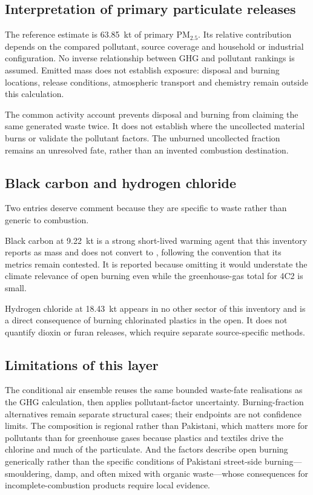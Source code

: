 \subsection{Interpretation of primary particulate releases}

The reference estimate is \SI{63.85}{\kilo\tonne} of primary PM$_{2.5}$. Its relative contribution depends on the compared pollutant, source coverage and household or industrial configuration. No inverse relationship between GHG and pollutant rankings is assumed. Emitted mass does not establish exposure: disposal and burning locations, release conditions, atmospheric transport and chemistry remain outside this calculation.

The common activity account prevents disposal and burning from claiming the same generated waste twice. It does not establish where the uncollected material burns or validate the pollutant factors. The unburned uncollected fraction remains an unresolved fate, rather than an invented combustion destination.

\subsection{Black carbon and hydrogen chloride}

Two entries deserve comment because they are specific to waste rather than generic to
combustion.

Black carbon at \SI{9.22}{\kilo\tonne} is a strong short-lived warming agent that this
inventory reports as mass and does not convert to \COe{}, following the convention that its
metrics remain contested. It is reported because omitting it would understate the climate
relevance of open burning even while the greenhouse-gas total for 4C2 is small.

Hydrogen chloride at \SI{18.43}{\kilo\tonne} appears in no other sector of this inventory and
is a direct consequence of burning chlorinated plastics in the open. It does not quantify dioxin or furan releases, which require separate source-specific methods.

\subsection{Limitations of this layer}

The conditional air ensemble reuses the same bounded waste-fate realisations as the GHG calculation, then applies pollutant-factor uncertainty. Burning-fraction alternatives remain separate structural cases; their endpoints are not confidence limits. The composition is regional rather than Pakistani, which matters more for
pollutants than for greenhouse gases because plastics and textiles drive the chlorine and much
of the particulate. And the factors describe open burning generically rather than the specific
conditions of Pakistani street-side burning---smouldering, damp, and often mixed with organic
waste---whose consequences for incomplete-combustion products require local evidence.
